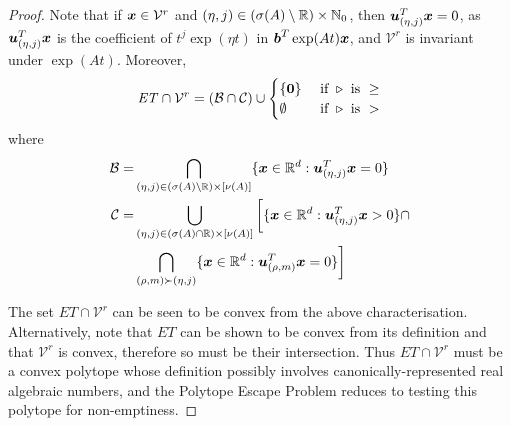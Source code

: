 \begin{proof}
Note that if $\boldsymbol{x}\in\mathcal{V}^{r}$ and $(\eta,j)\in
(\sigma(A)\setminus \mathbb{R})\times \mathbb{N}_{0}$, then
$\boldsymbol{u}_{(\eta,j)}^{T}\boldsymbol{x}=0$, as
$\boldsymbol{u}_{(\eta,j)}^{T}\boldsymbol{x}$ is the coefficient of $t^{j} \exp(\eta
t)$ in $\boldsymbol{b}^{T}\exp(At) \boldsymbol{x}$, and $\mathcal{V}^{r}$ is
invariant under $\exp(At)$. Moreover,
%
\begin{align*}
\mathit{ET}\cap\mathcal{V}^{r}=(\mathcal{B}\cap\mathcal{C}) \cup
\begin{cases}
\lbrace \boldsymbol{0} \rbrace & \text{ if } \triangleright \text{ is } \geq \\
\emptyset & \text{ if } \triangleright \text{ is } >
\end{cases}
\end{align*}
where
\begin{align*}
\mathcal{B}=&\bigcap\limits_{(\eta,j)\in (\sigma(A)\setminus \mathbb{R})\times [\nu(A)]} \lbrace \boldsymbol{x}\in\mathbb{R}^{d}: \boldsymbol{u}_{(\eta,j)}^{T} \boldsymbol{x}=0 \rbrace \\
\mathcal{C}=&\bigcup\limits_{(\eta,j)\in(\sigma(A)\cap \mathbb{R})\times [\nu(A)]} \bigg[ \lbrace \boldsymbol{x}\in\mathbb{R}^{d}: \boldsymbol{u}_{(\eta,j)}^{T} \boldsymbol{x}>0 \rbrace \cap \\
&\bigcap\limits_{(\rho,m)\succ (\eta,j)} \lbrace \boldsymbol{x}\in\mathbb{R}^{d}: \boldsymbol{u}_{(\rho,m)}^{T} \boldsymbol{x}=0 \rbrace \bigg]
\end{align*}

The set $\mathit{ET}\cap\mathcal{V}^{r}$ can be seen to be convex from
the above characterisation. Alternatively, note that $\mathit{ET}$ can
be shown to be convex from its definition and that $\mathcal{V}^{r}$
is convex, therefore so must be their intersection. Thus
$\mathit{ET}\cap\mathcal{V}^{r}$ must be a convex polytope whose
definition possibly involves canonically-represented real algebraic
numbers, and the Polytope Escape Problem reduces to testing this
polytope for non-emptiness.
\end{proof}
